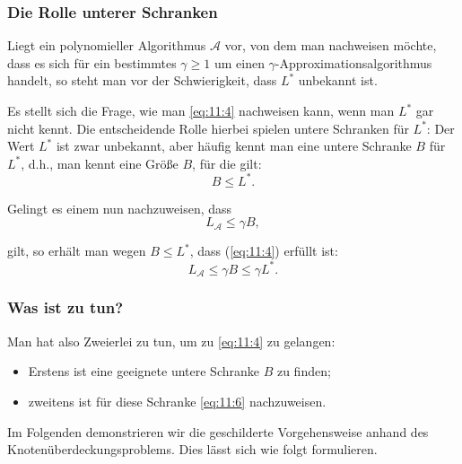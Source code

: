 \documentclass[smaller]{beamer}
\begin{document}
\begin{frame}
\frametitle{Die Rolle unterer Schranken}
Liegt ein polynomieller Algorithmus $\mathcal{A}$ vor, von dem man nachweisen möchte, dass es sich für ein bestimmtes $\gamma \geq 1$ um einen $\gamma$-Approximationsalgorithmus handelt, \alert{so steht man vor der Schwierigkeit, dass $L^*$ unbekannt ist}. \\ \vspace*{0.2cm}

Es stellt sich die Frage, wie man \eqref{eq:11:4} nachweisen kann, wenn man $L^*$ gar nicht kennt. Die entscheidende Rolle hierbei spielen \alert{untere Schranken} für $L^*$: Der Wert $L^*$ ist zwar unbekannt, aber häufig kennt man eine untere Schranke $B$ für $L^*$, d.h., man kennt eine Größe $B$, für die gilt:
\begin{equation}
\label{eq:11:5}
B \leq L^*.
\end{equation}

Gelingt es einem nun nachzuweisen, dass
\begin{equation}
\label{eq:11:6}
L_{\mathcal{A}} \leq \gamma B,
\end{equation}

gilt, so erhält man wegen $B \leq L^*$, dass (\ref{eq:11:4}) erfüllt ist:
\[
L_{\mathcal{A}} \leq \gamma B \leq \gamma L^*.
\]
\end{frame}

\begin{frame}
\frametitle{Was ist zu tun?}
Man hat also Zweierlei zu tun, um zu \eqref{eq:11:4} zu gelangen:
\begin{itemize}
\item Erstens ist eine geeignete untere Schranke $B$ zu finden;
\item zweitens ist für diese Schranke \eqref{eq:11:6} nachzuweisen.
\end{itemize}

Im Folgenden demonstrieren wir die geschilderte Vorgehensweise anhand des \alert{Knotenüberdeckungsproblems}. Dies lässt sich wie folgt formulieren.
\end{frame}
\end{document}
